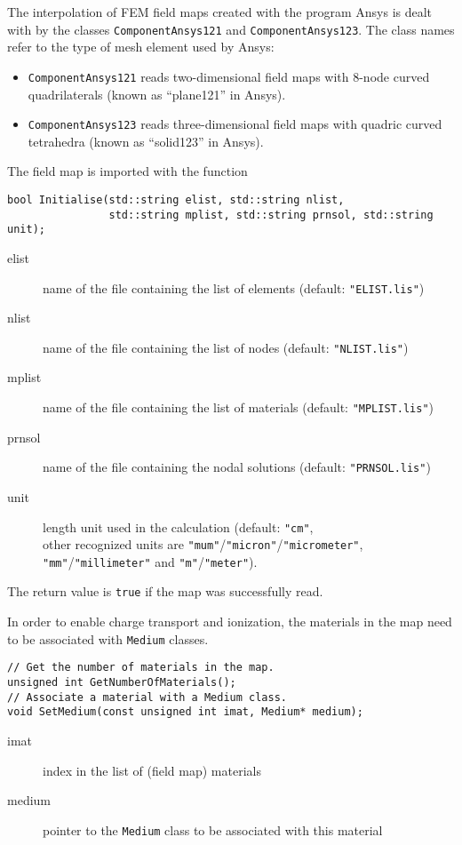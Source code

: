 The interpolation of FEM field maps 
created with the program Ansys \cite{ANSYS} 
is dealt with by the classes
\texttt{ComponentAnsys121} and \texttt{ComponentAnsys123}. 
The class names refer to the type of mesh element used by Ansys:
  \begin{itemize}
  \item
  \texttt{ComponentAnsys121} reads two-dimensional field maps 
with 8-node curved quadrilaterals (known as ``plane121'' in Ansys). 
  \item
  \texttt{ComponentAnsys123} reads three-dimensional field maps 
with quadric curved tetrahedra (known as ``solid123'' in Ansys).
  \end{itemize}
The field map is imported with the function
\begin{lstlisting}
bool Initialise(std::string elist, std::string nlist,
                std::string mplist, std::string prnsol, std::string unit);
\end{lstlisting}
\begin{description}
  \item[elist]
  name of the file containing the list of elements 
  (default: \texttt{"ELIST.lis"})
  \item[nlist]
  name of the file containing the list of nodes
  (default: \texttt{"NLIST.lis"})
  \item[mplist]
  name of the file containing the list of materials
  (default: \texttt{"MPLIST.lis"})
  \item[prnsol]
  name of the file containing the nodal solutions
  (default: \texttt{"PRNSOL.lis"})
  \item[unit]
  length unit used in the calculation (default: \texttt{"cm"}, \\ 
  other recognized units are 
  \texttt{"mum"}/\texttt{"micron"}/\texttt{"micrometer"},
  \texttt{"mm"}/\texttt{"millimeter"} and 
  \texttt{"m"}/\texttt{"meter"}).
\end{description}
The return value is \texttt{true} if the map was successfully read. 

In order to enable charge transport and ionization,
the materials in the map need to be associated with \texttt{Medium} classes.
\begin{lstlisting}
// Get the number of materials in the map.
unsigned int GetNumberOfMaterials();
// Associate a material with a Medium class.
void SetMedium(const unsigned int imat, Medium* medium);
\end{lstlisting}
\begin{description}
\item[imat]
index in the list of (field map) materials
\item[medium]
pointer to the \texttt{Medium} class to be associated with this material
\end{description}

